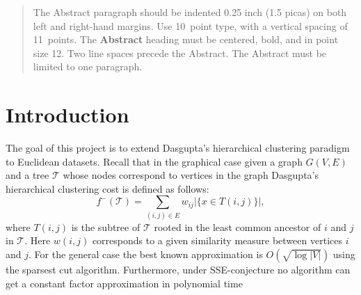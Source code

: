 \documentclass[twoside]{article}
\begin{document}
%

%


\begin{abstract}
  The Abstract paragraph should be indented 0.25 inch (1.5 picas) on
  both left and right-hand margins. Use 10~point type, with a vertical
  spacing of 11~points. The \textbf{Abstract} heading must be centered,
  bold, and in point size 12. Two line spaces precede the
  Abstract. The Abstract must be limited to one paragraph.
\end{abstract}

\section{Introduction}

The goal of this project is to extend Dasgupta's hierarchical clustering paradigm to Euclidean datasets.
Recall that in the graphical case given a graph $G(V,E)$ and a tree $\mathcal T$ whose nodes correspond to vertices in the graph Dasgupta's hierarchical clustering cost is defined as follows:
$$f^-(\mathcal T) = \sum_{(i,j) \in E} w_{ij} |\{x \in T(i,j)\}|,$$
where $T(i,j)$ is the subtree of $\mathcal T$ rooted in the least common ancestor of $i$ and $j$ in $\mathcal T$.
Here $w(i,j)$ corresponds to a given similarity measure between vertices $i$ and $j$.
For the general case the best known approximation is $O(\sqrt{\log |V|})$ using the sparsest cut algorithm. Furthermore, under SSE-conjecture no algorithm can get a constant factor approximation in polynomial time~\cite{CC17}
\end{document}
